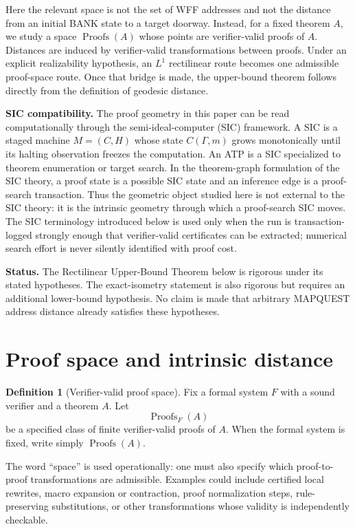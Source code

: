 \documentclass[11pt]{article}
\theoremstyle{definition}
\newtheorem{definition}[theorem]{Definition}
\newcommand{\Proofs}{\operatorname{Proofs}}
\begin{document}
Here the relevant space is not the set of WFF addresses and not the distance from an initial BANK state to a target doorway.  Instead, for a fixed theorem $A$, we study a space $\Proofs(A)$ whose points are verifier-valid proofs of $A$.  Distances are induced by verifier-valid transformations between proofs.  Under an explicit realizability hypothesis, an $L^1$ rectilinear route becomes one admissible proof-space route.  Once that bridge is made, the upper-bound theorem follows directly from the definition of geodesic distance.

\medskip
\noindent\textbf{SIC compatibility.}  The proof geometry in this paper can be read computationally through the semi-ideal-computer (SIC) framework.  A SIC is a staged machine $M=(C,H)$ whose state $C(\Gamma,m)$ grows monotonically until its halting observation freezes the computation.  An ATP is a SIC specialized to theorem enumeration or target search.  In the theorem-graph formulation of the SIC theory, a proof state is a possible SIC state and an inference edge is a proof-search transaction.  Thus the geometric object studied here is not external to the SIC theory: it is the intrinsic geometry through which a proof-search SIC moves.  The SIC terminology introduced below is used only when the run is transaction-logged strongly enough that verifier-valid certificates can be extracted; numerical search effort is never silently identified with proof cost.

\medskip
\noindent\textbf{Status.} The Rectilinear Upper-Bound Theorem below is rigorous under its stated hypotheses.  The exact-isometry statement is also rigorous but requires an additional lower-bound hypothesis.  No claim is made that arbitrary MAPQUEST address distance already satisfies these hypotheses.

\section{Proof space and intrinsic distance}

\begin{definition}[Verifier-valid proof space]
Fix a formal system $F$ with a sound verifier and a theorem $A$.  Let
\[
\Proofs_F(A)
\]
be a specified class of finite verifier-valid proofs of $A$.  When the formal system is fixed, write simply $\Proofs(A)$.
\end{definition}

The word ``space'' is used operationally: one must also specify which proof-to-proof transformations are admissible.  Examples could include certified local rewrites, macro expansion or contraction, proof normalization steps, rule-preserving substitutions, or other transformations whose validity is independently checkable.
\end{document}
